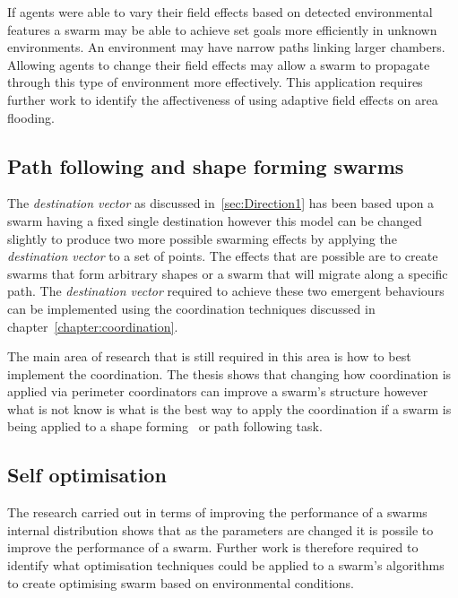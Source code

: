 If agents were able to vary their field effects based on detected environmental features a swarm may be able to achieve set goals more efficiently in unknown environments. An environment may have narrow paths linking larger chambers. Allowing agents to change their field effects may allow a swarm to propagate through this type of environment more effectively. This application requires further work to identify the affectiveness of using adaptive field effects on area flooding.
 
\subsection{Path following and shape forming swarms}\label{sec:DirectionalShape1}
The \textit{destination vector} as discussed in~\autoref{sec:Direction1} has been based upon a swarm having a fixed single destination however this model can be changed slightly to produce two more possible swarming effects by applying the \textit{destination vector} to a set of points. The effects that are possible are to create swarms that form arbitrary shapes or a swarm that will migrate along a specific path. The \textit{destination vector} required to achieve these two emergent behaviours can be implemented using the coordination techniques discussed in chapter~\ref{chapter:coordination}.

The main area of research that is still required in this area is how to best implement the coordination. The thesis shows that changing how coordination is applied via perimeter coordinators can improve a swarm's structure however what is not know is what is the best way to apply the coordination if a swarm is being applied to a shape forming~\cite{EP:07} or path following task.

\subsection{Self optimisation}\label{sec:Optimisation1}
The research carried out in terms of improving the performance of a swarms internal distribution shows that as the parameters are changed it is possile to improve the performance of a swarm. Further work is therefore required to identify what optimisation techniques could be applied to a swarm's algorithms to create optimising swarm based on environmental conditions.

